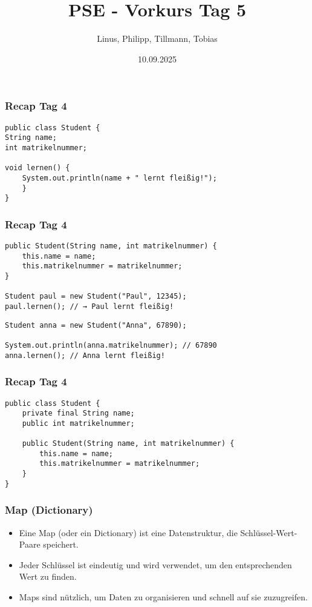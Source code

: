 \documentclass{../../presentation}
\title{PSE - Vorkurs Tag 5}
\author{Linus, Philipp, Tillmann, Tobias}
\institute{FIUS - Fachgruppe Informatik Universität Stuttgart}
\date{10.09.2025}
\begin{document}
\begin{frame}
	\titlepage
\end{frame}

\begin{frame}[fragile]
	\frametitle{Recap Tag 4}
	\pause
	\begin{verbatim}
public class Student {
String name;
int matrikelnummer;

void lernen() {
	System.out.println(name + " lernt fleißig!");
	}
}
	\end{verbatim}
\end{frame}

\begin{frame}[fragile]
	\frametitle{Recap Tag 4}
	\pause
	\begin{verbatim}
public Student(String name, int matrikelnummer) {
	this.name = name;
	this.matrikelnummer = matrikelnummer;
}

Student paul = new Student("Paul", 12345);
paul.lernen(); // → Paul lernt fleißig!
	\end{verbatim}
	\pause
	\begin{verbatim}
Student anna = new Student("Anna", 67890);

System.out.println(anna.matrikelnummer); // 67890
anna.lernen(); // Anna lernt fleißig!
	\end{verbatim}
\end{frame}

\begin{frame}[fragile]
	\frametitle{Recap Tag 4}
	\pause
	\begin{verbatim}
public class Student {
	private final String name;
	public int matrikelnummer;

	public Student(String name, int matrikelnummer) {
		this.name = name;
		this.matrikelnummer = matrikelnummer;
	}
}
	\end{verbatim}
\end{frame}

\begin{frame}[fragile]
	\frametitle{Map (Dictionary)}
	\begin{itemize}
		\item Eine Map (oder ein Dictionary) ist eine Datenstruktur, die Schlüssel-Wert-Paare speichert.
		\item Jeder Schlüssel ist eindeutig und wird verwendet, um den entsprechenden Wert zu finden.
		\item Maps sind nützlich, um Daten zu organisieren und schnell auf sie zuzugreifen.
	\end{itemize}
\end{frame}
\end{document}
